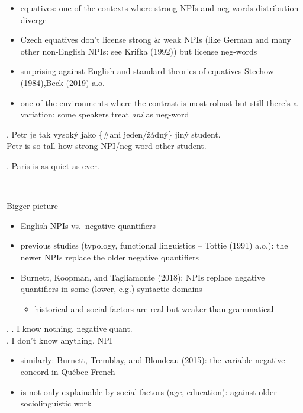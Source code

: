 \documentclass[
  ignorenonframetext,
]{beamer}
\providecommand{\tightlist}{%
  \setlength{\itemsep}{0pt}\setlength{\parskip}{0pt}}\usepackage{longtable,booktabs,array}
\begin{document}
\begin{frame}
\begin{itemize}
\tightlist
\item
  equatives: one of the contexts where strong NPIs and neg-words
  distribution diverge
\item
  Czech equatives don't license strong \& weak NPIs (like German and
  many other non-English NPIs: see Krifka (1992)) but license neg-words
\item
  surprising against English and standard theories of equatives Stechow
  (1984),Beck (2019) a.o.
\item
  one of the environments where the contrast is most robust but still
  there's a variation: some speakers treat \emph{ani} as neg-word
\end{itemize}

\exg. Petr je tak vysoký jako \{\#ani jeden/žádný\} jiný student.\\
Petr is so tall how strong NPI/neg-word other student.\\
\hspace*{0.333em}

\ex. Paris is as quiet as ever.

~
\end{frame}

\begin{frame}
\begin{block}{Bigger picture}
\protect\hypertarget{bigger-picture}{}
\begin{itemize}
\tightlist
\item
  English NPIs vs.~negative quantifiers
\item
  previous studies (typology, functional linguistics -- Tottie (1991)
  a.o.): the newer NPIs replace the older negative quantifiers
\item
  Burnett, Koopman, and Tagliamonte (2018): NPIs replace negative
  quantifiers in some (lower, e.g.) syntactic domains

  \begin{itemize}
  \tightlist
  \item
    historical and social factors are real but weaker than grammatical
  \end{itemize}
\end{itemize}

\ex. \a. I know nothing. \hfill negative quant.\\
\b. I don't know anything. \hfill NPI

\begin{itemize}
\tightlist
\item
  similarly: Burnett, Tremblay, and Blondeau (2015): the variable
  negative concord in Québec French
\item
  is not only explainable by social factors (age, education): against
  older sociolinguistic work
\end{itemize}
\end{block}
\end{frame}
\end{document}
